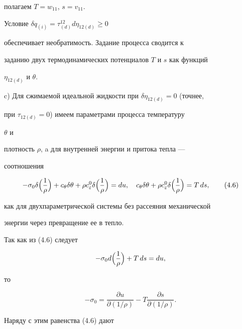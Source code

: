 полагаем $T=w_{11}$, $s=v_{11}$.


Условие $\delta q_{(i)}=\tau^{12}_{(d)}d\eta_{12(d)}\ge 0$


обеспечивает необратимость. Задание процесса сводится к


заданию двух термодинамических потенциалов $T$ и $s$ как функций


$\eta_{12(d)}$ и $\theta$.


\medskip





c) Для сжимаемой идеальной жидкости при $\delta\eta_{12(d)}=0$ (точнее,


при $\tau_{12(d)}=0$) имеем параметрами процесса температуру


$\theta$ и


плотность $\rho $, a для внутренней энергии и притока тепла ---


соотношения


\begin{equation}


-\sigma_0\delta\Bigl(\frac{1}{\rho }\Bigr)+c_\theta\delta\theta+


\rho  c^0_\varepsilon\delta\Bigl(\frac{1}{\rho }\Bigr)=du,\quad


c_\theta\delta\theta+\rho  c^0_\varepsilon\delta\Bigl(


\frac{1}{\rho }\Bigr)=T\,ds,\tag{4.6}


\end{equation}


как для двухпараметрической системы без рассеяния механической


энергии через превращение ее в тепло.





Так как из (4.6) следует


$$


-\sigma_0 d\Bigl(\frac{1}{\rho }\Bigr)+T\,ds=du,


$$


то


\begin{equation}


-\sigma_0=\frac{\partial u}{\partial(1/\rho )}-


T\frac{\partial s}{\partial(1/\rho )}.\tag{4.7}


\end{equation}


Наряду с этим равенства (4.6) дают


